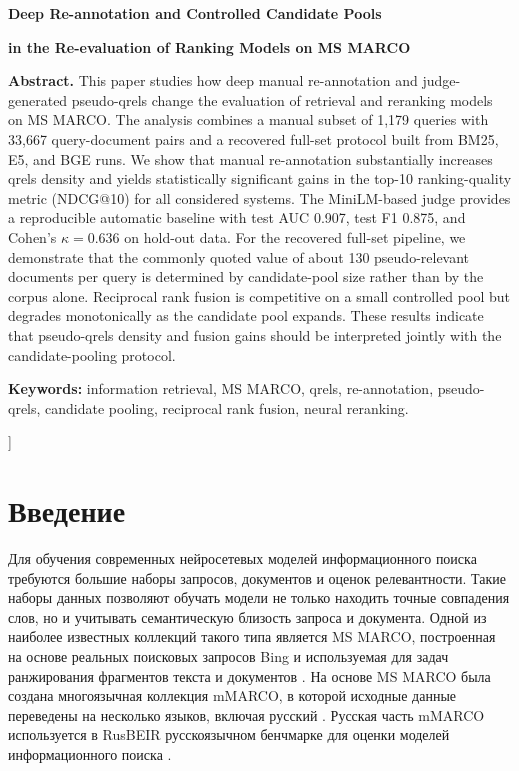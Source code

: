 \documentclass[10pt,a4paper,twocolumn]{article}
\begin{document}
\begin{@twocolumnfalse}
\medskip
{\centering
\textbf{Deep Re-annotation and Controlled Candidate Pools}\par
\vspace{0.15em}
\textbf{in the Re-evaluation of Ranking Models on MS MARCO}\par}

\noindent\textbf{Abstract.} This paper studies how deep manual re-annotation and judge-generated pseudo-qrels change the evaluation of retrieval and reranking models on MS MARCO. The analysis combines a manual subset of 1,179 queries with 33,667 query-document pairs and a recovered full-set protocol built from BM25, E5, and BGE runs. We show that manual re-annotation substantially increases qrels density and yields statistically significant gains in the top-10 ranking-quality metric (NDCG@10) for all considered systems. The MiniLM-based judge provides a reproducible automatic baseline with test AUC 0.907, test F1 0.875, and Cohen's $\kappa = 0.636$ on hold-out data. For the recovered full-set pipeline, we demonstrate that the commonly quoted value of about 130 pseudo-relevant documents per query is determined by candidate-pool size rather than by the corpus alone. Reciprocal rank fusion is competitive on a small controlled pool but degrades monotonically as the candidate pool expands. These results indicate that pseudo-qrels density and fusion gains should be interpreted jointly with the candidate-pooling protocol.

\medskip
\noindent\textbf{Keywords:} information retrieval, MS MARCO, qrels, re-annotation, pseudo-qrels, candidate pooling, reciprocal rank fusion, neural reranking.
\vspace{1.0em}
\end{@twocolumnfalse}
]

\section{Введение}

Для обучения современных нейросетевых моделей информационного поиска требуются большие наборы запросов, документов и оценок релевантности. Такие наборы данных позволяют обучать модели не только находить точные совпадения слов, но и учитывать семантическую близость запроса и документа. Одной из наиболее известных коллекций такого типа является MS MARCO, построенная на основе реальных поисковых запросов Bing и используемая для задач ранжирования фрагментов текста и документов \cite{bajaj2016msmarco}. На основе MS MARCO была создана многоязычная коллекция mMARCO, в которой исходные данные переведены на несколько языков, включая русский \cite{bonifacio2022mmarco}. Русская часть mMARCO используется в RusBEIR \textemdash{} русскоязычном бенчмарке для оценки моделей информационного поиска \cite{2025rusbeir}.
\end{document}
